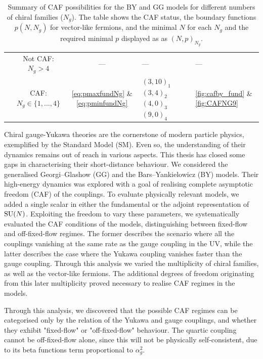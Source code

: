 \begin{table}[ht]
\begin{tabularx}{\textwidth}{@{}ccc >{\centering\arraybackslash}X >{\centering\arraybackslash}m{1.8cm} @{}}
\rowcolor{myLightBlue} & Not CAF: $N_g > 4$ & --- & --- & --- \\
\rowcolor{myLightBlue} \multirow{-2}{*}{BY} & CAF: $N_g\in\{1,\dots,4\}$  &\eqref{eq:pmaxfundNg} \& \eqref{eq:pminfundNg} & $(3,10)_1$ $(3,4)_2$ $(4,0)_3$ $(9,0)_4$   &\ref{fig:cafby_fund} \& \ref{fig:CAFNG9} \\

\bottomrule
\end{tabularx}
\caption{Summary of CAF possibilities for the BY and GG models for different numbers of chiral families ($N_g$). The table shows the CAF status, the boundary functions $p(N,N_g)$ for vector-like fermions, and the minimal $N$ for each $N_g$ and the required minimal $p$ displayed as as $(N,p)_{N_g}$.\label{tab:conc_part1}}
\end{table}

Chiral gauge-Yukawa theories are the cornerstone of modern particle physics, exemplified by the Standard Model (SM). Even so, the understanding of their dynamics remains out of reach in various aspects. This thesis has closed some gaps in characterising their short-distance behaviour. We  considered the generalised Georgi--Glashow (GG) and the Bars--Yankielowicz (BY) models. Their high-energy dynamics was explored with a goal of realising complete asymptotic freedom (CAF) of the couplings. To evaluate physically relevant models, we added a single scalar in either the fundamental or the adjoint representation of $\mathrm{SU}(N)$. Exploiting the freedom to vary these parameters, we systematically evaluated the CAF conditions of the models, distinguishing between fixed-flow and off-fixed-flow regimes. The former describes the scenario where all the couplings vanishing at the same rate as the gauge coupling in the UV, while the latter describes the case where the Yukawa coupling vanishes faster than the gauge coupling. Through this analysis we varied the multiplicity of chiral families, as well as the vector-like fermions. The additional degrees of freedom originating from this later multiplicity proved necessary to realise CAF regimes in the models. 

Through this analysis, we discovered that the possible CAF regimes can be categorised only by the relation of the Yukawa and gauge couplings, and whether they exhibit "fixed-flow" or "off-fixed-flow" behaviour. The quartic coupling cannot be off-fixed-flow alone, since this will not be physically self-consistent, due to its beta functions term proportional to $\alpha_g^2$.

